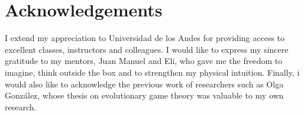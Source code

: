 \thispagestyle{empty}
\section*{\centering Acknowledgements}

I extend my appreciation to Universidad de los Andes for providing access to excellent classes, instructors and colleagues. I would like to express my sincere gratitude to my mentors, Juan Manuel and Eli, who gave me the freedom to imagine, think outside the box and to strengthen my physical intuition. Finally, i would also like to acknowledge
the previous work of researchers such as Olga González, 
whose thesis on evolutionary game theory 
\cite{lopezRelevanciaModeloPiedra2024} was valuable 
to my own research. \\ 
